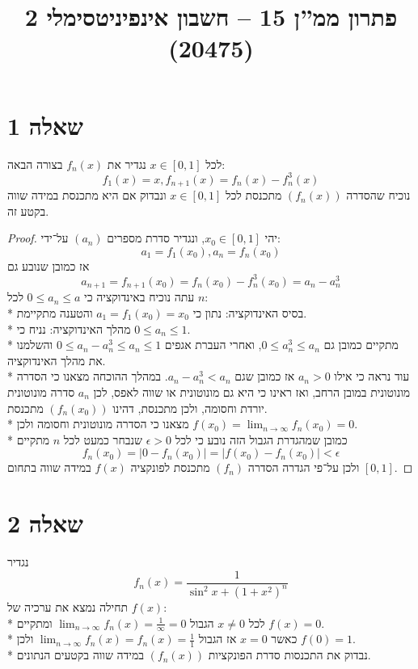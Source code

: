 
\title{פתרון ממ''ן 15 – חשבון אינפיניטסימלי 2 (20475)}


\maketitle
\maketitleprint{}

\section{שאלה 1}
לכל $x \in [0, 1]$ נגדיר את $f_n(x)$ בצורה הבאה:
\[
	f_1(x) = x, f_{n + 1}(x) = f_n(x) - f_n^3(x)
\]
נוכיח שהסדרה $(f_n(x))$ מתכנסת לכל $x \in [0, 1]$ ונבדוק אם היא מתכנסת במידה שווה בקטע זה.
\begin{proof}
	יהי $x_0 \in [0, 1]$, ונגדיר סדרת מספרים $(a_n)$ על־ידי:
	\[
		a_1 = f_1(x_0), a_{n} = f_n(x_0)
	\]
	אז כמובן שנובע גם
	\[
		a_{n + 1}
		= f_{n + 1}(x_0)
		= f_n(x_0) - f_n^3(x_0) 
		= a_n - a_n^3
	\]
	עתה נוכיח באינדוקציה כי $0 \le a_n \le a$ לכל $n$: \\*
	בסיס האינדוקציה: נתון כי $a_1 = f_1(x_0) = x_0$ והטענה מתקיימת. \\*
	מהלך האינדוקציה: נניח כי $0 \le a_n \le 1$. \\*
	מתקיים כמובן גם $0 \le a_n^3 \le a_n$, ואחרי העברת אגפים $0 \le a_n - a_n^3 \le a_n \le 1$ והשלמנו את מהלך האינדוקציה. \\*
	עוד נראה כי אילו $a_n > 0$ אז כמובן שגם $a_n - a_n^3 < a_n$.
	במהלך ההוכחה מצאנו כי הסדרה מונוטונית במובן הרחב, ואז ראינו כי היא גם מונוטונית או שווה לאפס,
	לכן $a_n$ סדרה מונוטונית יורדת וחסומה, ולכן מתכנסת, דהינו $(f_n(x_0))$ מתכנסת. \\*
	מצאנו כי הסדרה מונוטונית וחסומה ולכן $f(x_0) = \lim_{n \to \infty} f_n(x_0) = 0$. \\*
	כמובן שמהגדרת הגבול הזה נובע כי לכל $\epsilon > 0$ שנבחר כמעט לכל $n$ מתקיים 
	\[
		f_n(x_0) = \lvert 0 - f_n(x_0) \rvert = \lvert f(x_0) - f_n(x_0) \rvert < \epsilon
	\]
	ולכן על־פי הגדרה הסדרה $(f_n)$ מתכנסת לפונקציה $f(x)$ במידה שווה בתחום $[0, 1]$.
\end{proof}

\section{שאלה 2}
נגדיר
\[
	f_n(x) = \frac{1}{\sin^2 x + {(1 + x^2)}^n}
\]
תחילה נמצא את ערכיה של $f(x)$: \\*
לכל $x \ne 0$ הגבול $\lim_{n \to \infty} f_n(x) = \frac{1}{\infty} = 0$ ומתקיים $f(x) = 0$. \\*
כאשר $x = 0$ אז הגבול $\lim_{n \to \infty} f_n(x) = f_n(x) = \frac{1}{1}$ ולכן $f(0) = 1$. \\*
נבדוק את התכנסות סדרת הפונקציות $(f_n(x))$ במידה שווה בקטעים הנתונים.


